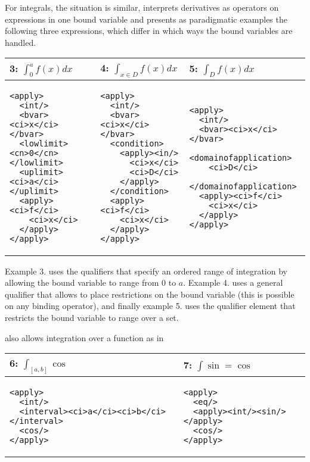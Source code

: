 \documentclass{llncs}
\begin{document}
For integrals, the situation is similar, {\mathml} interprets derivatives as operators on
expressions in one bound variable and presents as paradigmatic examples the following
three expressions, which differ in which ways the bound variables are handled.
\begin{center}\lstset{frame=none,numbers=none,lineskip=-.7ex,aboveskip=-.5em,belowskip=-1em,language=MathML2}
\begin{tabular}{|p{5.9cm}|p{4.4cm}|p{4.4cm}|}\hline
  3: $\int_0^af(x) dx$ & 4: $\int_{x\in D}f(x) dx$ & 5: $\int_Df(x)dx$\\\hline
\begin{lstlisting}
<apply>
  <int/>
  <bvar><ci>x</ci></bvar>
  <lowlimit><cn>0</cn></lowlimit>
  <uplimit><ci>a</ci></uplimit>
  <apply><ci>f</ci>
    <ci>x</ci>
  </apply>
</apply>
\end{lstlisting}
&
\begin{lstlisting}[language=MathML2]
<apply>
  <int/>
  <bvar><ci>x</ci></bvar>
  <condition>
    <apply><in/>
      <ci>x</ci>
      <ci>D</ci>
    </apply>
  </condition>
  <apply><ci>f</ci>
    <ci>x</ci>
  </apply>
</apply>
\end{lstlisting}
&
\begin{lstlisting}[language=MathML2]
<apply>
  <int/>
  <bvar><ci>x</ci></bvar>
  <domainofapplication>
    <ci>D</ci>
  </domainofapplication>
  <apply><ci>f</ci>
    <ci>x</ci>
  </apply>
</apply>
\end{lstlisting}
\\\hline
\end{tabular}
\end{center}
Example 3. uses the {} {} qualifiers that specify an
ordered range of integration by allowing the bound variable to range from 0 to
$a$. Example 4. uses a general {} qualifier that allows to place
restrictions on the bound variable (this is possible on any binding operator), and finally
example 5. uses the {} qualifier element that restricts the
bound variable to range over a set. 

{} also allows integration over a function as in
\begin{center}\lstset{frame=none,numbers=none,lineskip=-.7ex,aboveskip=-.5em,belowskip=-1em,language=MathML2}
\begin{tabular}{|p{7.7cm}|p{5.3cm}|}\hline
  6: $\int_{[a,b]}\cos$ & 7: $\int\sin=\cos$\\\hline
\begin{lstlisting}
<apply>
  <int/>
  <interval><ci>a</ci><ci>b</ci></interval>
  <cos/>
</apply>
\end{lstlisting}
&
\begin{lstlisting}
<apply>
  <eq/>
  <apply><int/><sin/></apply>
  <cos/>
</apply>
\end{lstlisting}
\\\hline
\end{tabular}
\end{center}
\end{document}

